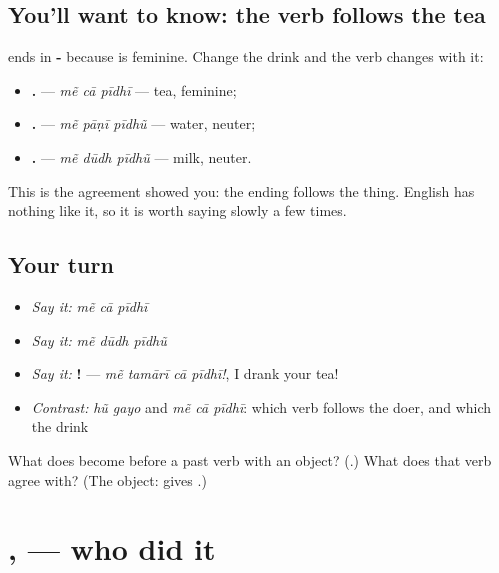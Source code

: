 \subsection*{You'll want to know: the verb follows the tea}
\textbf{} ends in \textbf{-} because \textbf{} is feminine. Change the drink and the verb changes with it:

\begin{itemize}
\raggedright
  \item \textbf{  .} — \emph{mẽ cā pīdhī} — tea, feminine;
  \item \textbf{  .} — \emph{mẽ pāṇī pīdhũ} — water, neuter;
  \item \textbf{  .} — \emph{mẽ dūdh pīdhũ} — milk, neuter.
\end{itemize}

This is the agreement \textbf{ } showed you: the ending follows the thing. English has nothing like it, so it is worth saying slowly a few times.

\subsection*{Your turn}
\begin{itemize}
\raggedright
  \item \emph{Say it:} \emph{mẽ cā pīdhī}
  \item \emph{Say it:} \emph{mẽ dūdh pīdhũ}
  \item \emph{Say it:} \textbf{   !} — \emph{mẽ tamārī cā pīdhī!}, I drank your tea!
  \item \emph{Contrast:} \emph{hũ gayo} and \emph{mẽ cā pīdhī}: which verb follows the doer, and which the drink
\end{itemize}

\begin{tcolorbox}[breakable,colback=teal!4,colframe=teal!35!black,title={Before you move on}]
What does \textbf{} become before a past verb with an object? (\textbf{}.) What does that verb agree with? (The object: \textbf{} gives \textbf{}.)
\end{tcolorbox}
\section[\texorpdfstring{\gu{મેં} · \gu{તેં} · \gu{તેણે} · \gu{અમે} … (mẽ · tẽ · teṇe …)}{મેં · તેં · તેણે · અમે … (mẽ · tẽ · teṇe …)}]{,  — who did it}

